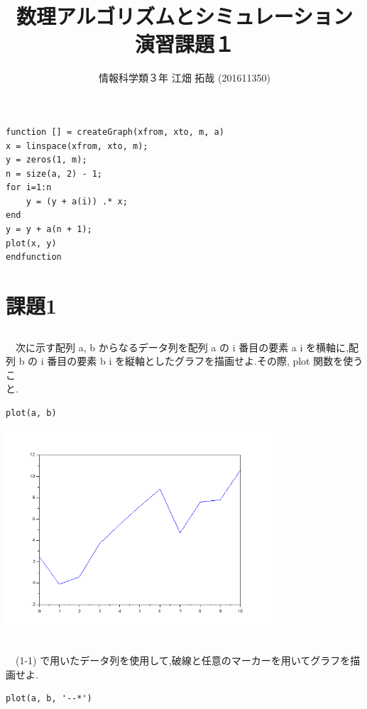 \documentclass{scrartcl}
\author{情報科学類３年 江畑 拓哉 (201611350)}
\date{}
\title{数理アルゴリズムとシミュレーション\\\medskip
\large 演習課題１}
\begin{document}
\maketitle
\begin{verbatim}
function [] = createGraph(xfrom, xto, m, a)
x = linspace(xfrom, xto, m);
y = zeros(1, m);
n = size(a, 2) - 1;
for i=1:n
    y = (y + a(i)) .* x;
end
y = y + a(n + 1);
plot(x, y)
endfunction
\end{verbatim}


\section{課題1}
\label{sec:orgd2a45dc}
\subsection{}
\label{sec:org758abab}
　次に示す配列 a, b からなるデータ列を配列 a の i 番目の要素 a i を横軸に,配列 b の i 番目の要素 b i を縦軸としたグラフを描画せよ.その際, plot 関数を使うこ\\
と.\\
\begin{verbatim}
plot(a, b)
\end{verbatim}

\begin{center}
\includegraphics[width=10cm]{./1-1.png}
\end{center}
\subsection{}
\label{sec:org1542e71}
　(1-1) で用いたデータ列を使用して,破線と任意のマーカーを用いてグラフを描画せよ.\\
\begin{verbatim}
plot(a, b, '--*')
\end{verbatim}
\end{document}

